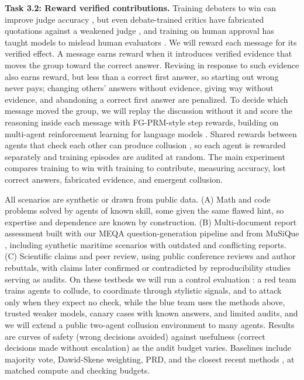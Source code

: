 \documentclass[11pt,letterpaper]{article}
\newcommand{\rg}[1]{\par\vspace{1pt}{\normalfont\bfseries\itshape #1}\par}
\newcommand{\task}[1]{\textbf{#1}\hspace{0.4em}}
\begin{document}
\task{Task 3.2: Reward verified contributions.} Training debaters to win can improve judge accuracy \cite{arnesen2024selfplay}, but even debate-trained critics have fabricated quotations against a weakened judge \cite{kenton2026debate}, and training on human approval has taught models to mislead human evaluators \cite{wen2025mislead}. We will reward each message for its verified effect. A message earns reward when it introduces verified evidence that moves the group toward the correct answer. Revising in response to such evidence also earns reward, but less than a correct first answer, so starting out wrong never pays; changing others' answers without evidence, giving way without evidence, and abandoning a correct first answer are penalized. To decide which message moved the group, we will replay the discussion without it and score the reasoning inside each message with FG-PRM-style step rewards, building on multi-agent reinforcement learning for language models \cite{park2025maporl,subramaniam2025multiagent}. Shared rewards between agents that check each other can produce collusion \cite{shi2026collusion}, so each agent is rewarded separately and training episodes are audited at random. The main experiment compares training to win with training to contribute, measuring accuracy, lost correct answers, fabricated evidence, and emergent collusion.

\rg{Task 4 (shared). Testbeds and a red-team evaluation}
All scenarios are synthetic or drawn from public data. (A) Math and code problems solved by agents of known skill, some given the same flawed hint, so expertise and dependence are known by construction. (B) Multi-document report assessment built with our MEQA question-generation pipeline \cite{li2024meqa} and from MuSiQue \cite{trivedi2022musique}, including synthetic maritime scenarios with outdated and conflicting reports. (C) Scientific claims and peer review, using public conference reviews and author rebuttals, with claims later confirmed or contradicted by reproducibility studies serving as audits. On these testbeds we will run a control evaluation \cite{greenblatt2024control}: a red team trains agents to collude, to coordinate through stylistic signals, and to attack only when they expect no check, while the blue team uses the methods above, trusted weaker models, canary cases with known answers, and limited audits, and we will extend a public two-agent collusion environment \cite{shi2026collusion} to many agents. Results are curves of safety (wrong decisions avoided) against usefulness (correct decisions made without escalation) as the audit budget varies. Baselines include majority vote, Dawid-Skene weighting, PRD, and the closest recent methods \cite{hossain2026agreement,zhu2026stopping,lev2023peernomination,qiu2026truthfulness,jiang2026disagreement}, at matched compute and checking budgets.
\end{document}
